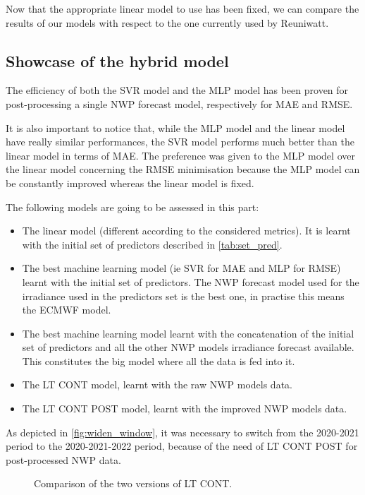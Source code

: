 Now that the appropriate linear model to use has been fixed, we can compare the results of our models with respect to the one currently used by Reuniwatt.  
\newpage
\subsection{Showcase of the hybrid model}
The efficiency of both the SVR model and the MLP model has been proven for post-processing a single NWP forecast model, respectively for MAE and RMSE.

It is also important to notice that, while the MLP model and the linear model have really similar performances, the SVR model performs much better than the linear model in terms of MAE.
The preference was given to the MLP model over the linear model concerning the RMSE minimisation because the MLP model can be constantly improved whereas the linear model is fixed.

The following models are going to be assessed in this part:
\begin{itemize}
    \item The linear model (different according to the considered metrics). It is learnt with the initial set of predictors described in \autoref{tab:set_pred}.
    \item The best machine learning model (ie SVR for MAE and MLP for RMSE) learnt with the initial set of predictors. The NWP forecast model used for the irradiance used in the predictors set is the best one, in practise this means the ECMWF model.
    \item The best machine learning model learnt with the concatenation of the initial set of predictors and all the other NWP models irradiance forecast available. This constitutes the big model where all the data is fed into it.
    \item The LT CONT model, learnt with the raw NWP models data.
    \item The LT CONT POST model, learnt with the improved NWP models data.
\end{itemize}

As depicted in \autoref{fig:widen_window}, it was necessary to switch from the 2020-2021 period to the 2020-2021-2022 period, because of the need of LT CONT POST for post-processed NWP data.
\newpage
\begin{figure}[htb!]
    \centering
    
\caption{Comparison of the two versions of LT CONT.}
\label{fig:widen_window}
\end{figure}

